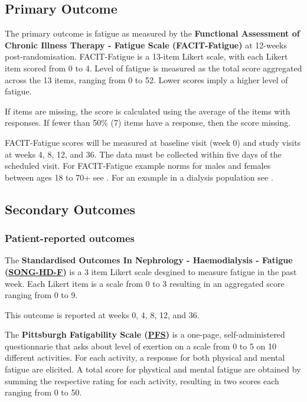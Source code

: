 \documentclass[
]{article}
\begin{document}
\hypertarget{primary-outcome}{
  \subsection{Primary Outcome}\label{primary-outcome}}

The primary outcome is fatigue as measured by the \textbf{Functional Assessment of Chronic Illness Therapy - Fatigue Scale (FACIT-Fatigue)} \cites{yellen1997measuring}{cella2002fatigue} at 12-weeks post-randomisation.
FACIT-Fatigue is a 13-item Likert scale, with each Likert item scored from 0 to 4.
Level of fatigue is measured as the total score aggregated across the 13 items, ranging from 0 to 52.
Lower scores imply a higher level of fatigue.

If items are missing, the score is calculated using the average of the items with responses.
If fewer than 50\% (7) items have a response, then the score missing.

FACIT-Fatigue scores will be measured at baseline visit (week 0) and study visits at weeks 4, 8, 12, and 36.
The data must be collected within five days of the scheduled visit.
For FACIT-Fatigue example norms for males and females between ages 18 to 70+ see \cite{montan2018general}.
For an example in a dialysis population see \cite{wang2015psychometric}.

\hypertarget{secondary-outcomes}{
  \subsection{Secondary Outcomes}\label{secondary-outcomes}}

\hypertarget{pro-outcomes}{
  \subsubsection{Patient-reported outcomes}\label{pro-outcomes}}

\label{outcome:song-hd-f}
The \textbf{Standardised Outcomes In Nephrology - Haemodialysis - Fatigue (\hyperref[analysis:song-hd-f]{SONG-HD-F})} \cite{ju2018establishing} is a 3 item Likert scale desgined to measure fatigue in the past week.
Each Likert item is a scale from 0 to 3 resulting in an aggregated score ranging from 0 to 9.

This outcome is reported at weeks 0, 4, 8, 12, and 36.

\label{outcome:pfs}
The \textbf{Pittsburgh Fatigability Scale (\hyperref[analysis:pfs]{PFS})} \cite{glynn2015pittsburgh} is a one-page, self-administered questionnarie that asks about level of exertion on a scale from 0 to 5 on 10 different activities.
For each activity, a response for both physical and mental fatigue are elicited.
A total score for phystical and mental fatigue are obtained by summing the respective rating for each activity, resulting in two scores each ranging from 0 to 50.
\end{document}
